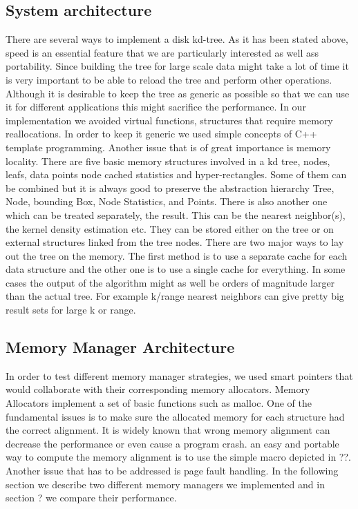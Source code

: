 \documentclass[12pt,letterpaper,doublespaced,ETD,dvips,proposal]{gtthesis}
\begin{document}
\begin{Body}
\subsection{System architecture} There are several ways to implement
a disk kd-tree. As it has been stated above, speed is an essential
feature that we are particularly interested as well ass portability.
Since building the tree for large scale data might take a lot of
time it is very important to be able to reload the tree and perform
other operations. Although it is desirable to keep the tree as
generic as possible so that we can use it for different applications
this might sacrifice the performance. In our implementation we
avoided virtual functions, structures that require memory
reallocations. In order to keep it generic we used simple concepts
of C++ template programming. Another issue that is of great
importance is memory locality. There are five basic memory
structures involved in a kd tree, nodes, leafs, data points node
cached statistics and hyper-rectangles. Some of them can be combined
but it is always good to preserve the abstraction hierarchy Tree,
Node, bounding Box, Node Statistics, and Points. There is also
another one which can be treated separately, the result. This can be
the nearest neighbor(s), the kernel density estimation etc. They can
be stored either on the tree or on external structures linked from
the tree nodes. There are two major ways to lay out the tree on the
memory. The first method is to use a separate cache for each data
structure and the other one is to use  a single cache for
everything. In some cases the output of the algorithm might as well
be orders of magnitude larger than the actual tree. For example
k/range nearest neighbors can give pretty big result sets for large
k or range.

\subsection{Memory Manager Architecture} In order to test different
memory manager strategies, we used smart pointers that would
collaborate with their corresponding memory allocators. Memory
Allocators implement a set of basic functions such as malloc. One of
the fundamental issues is to make sure the allocated memory for each
structure had the correct alignment. It is widely known that wrong
memory alignment can decrease the performance or even cause a
program crash. an easy and portable way to compute the memory
alignment is to use the simple macro depicted in ??. Another issue
that has to be addressed is page fault handling. In the following
section we describe two different memory managers we implemented and
in section ? we compare their performance.


\end{Body}
\end{document}
